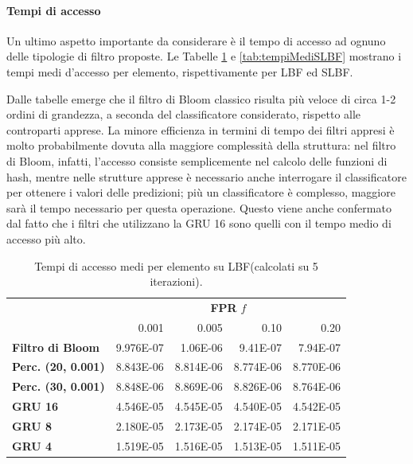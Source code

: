 \documentclass[../../main.tex]{subfiles}
\begin{document}
    \paragraph{Tempi di accesso}
    Un ultimo aspetto importante da considerare è il tempo di accesso ad ognuno delle tipologie di filtro proposte. Le Tabelle \ref{tab:tempiMediLBF} e \ref{tab:tempiMediSLBF} mostrano i tempi medi d'accesso per elemento, rispettivamente per LBF ed SLBF.

    Dalle tabelle emerge che il filtro di Bloom classico risulta più veloce di circa 1-2 ordini di grandezza, a seconda del classificatore considerato, rispetto alle controparti apprese. La minore efficienza in termini di tempo dei filtri appresi è molto probabilmente dovuta alla maggiore complessità della struttura: nel filtro di Bloom, infatti, l'accesso consiste semplicemente nel calcolo delle funzioni di hash, mentre nelle strutture apprese è necessario anche interrogare il classificatore per ottenere i valori delle predizioni; più un classificatore è complesso, maggiore sarà il tempo necessario per questa operazione. Questo viene anche confermato dal fatto che i filtri che utilizzano la GRU 16 sono quelli con il tempo medio di accesso più alto.

    \begin{table}[H]
        \centering
        \begin{tabular}{lrrrr}
            \toprule
            & \multicolumn{4}{c}{\textbf{FPR} $f$}\\
            & 0.001 & 0.005 & 0.10 & 0.20\\        
            \midrule
            \textbf{Filtro di Bloom} & 9.976E-07 & 1.06E-06 & 9.41E-07 & 7.94E-07\\
            \midrule
            \textbf{Perc. (20, 0.001)} & 8.843E-06 & 8.814E-06 &  8.774E-06 & 8.770E-06\\
            \textbf{Perc. (30, 0.001)} & 8.848E-06 & 8.869E-06 &  8.826E-06 & 8.764E-06\\
            \textbf{GRU 16} & 4.546E-05 & 4.545E-05 &  4.540E-05 & 4.542E-05\\
            \textbf{GRU 8} &  2.180E-05 & 2.173E-05 &  2.174E-05 & 2.171E-05\\
            \textbf{GRU 4} & 1.519E-05 & 1.516E-05 & 1.513E-05 & 1.511E-05\\
            \bottomrule
        \end{tabular}
        \caption{Tempi di accesso medi per elemento su LBF(calcolati su 5 iterazioni).}
        \label{tab:tempiMediLBF}
    \end{table}
\end{document}
